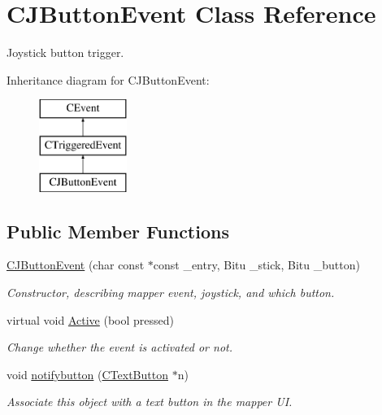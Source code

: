 \hypertarget{classCJButtonEvent}{\section{C\-J\-Button\-Event Class Reference}
\label{classCJButtonEvent}
}


Joystick button trigger.  


Inheritance diagram for C\-J\-Button\-Event\-:\begin{figure}[H]
\begin{center}
\leavevmode
\includegraphics[height=3.000000cm]{classCJButtonEvent}
\end{center}
\end{figure}
\subsection*{Public Member Functions}
\begin{DoxyCompactItemize}
\item 
\hypertarget{classCJButtonEvent_a1e52758b5a23171097f00bae1acf028a}{\hyperlink{classCJButtonEvent_a1e52758b5a23171097f00bae1acf028a}{C\-J\-Button\-Event} (char const $\ast$const \-\_\-entry, Bitu \-\_\-stick, Bitu \-\_\-button)}\label{classCJButtonEvent_a1e52758b5a23171097f00bae1acf028a}

\begin{DoxyCompactList}\small\item\em Constructor, describing mapper event, joystick, and which button. \end{DoxyCompactList}\item 
\hypertarget{classCJButtonEvent_ad3be3de6af81cfbcf569e2d9bcee7e84}{virtual void \hyperlink{classCJButtonEvent_ad3be3de6af81cfbcf569e2d9bcee7e84}{Active} (bool pressed)}\label{classCJButtonEvent_ad3be3de6af81cfbcf569e2d9bcee7e84}

\begin{DoxyCompactList}\small\item\em Change whether the event is activated or not. \end{DoxyCompactList}\item 
\hypertarget{classCJButtonEvent_adc04a0aadec5744e0408c5e780d54d6b}{void \hyperlink{classCJButtonEvent_adc04a0aadec5744e0408c5e780d54d6b}{notifybutton} (\hyperlink{classCTextButton}{C\-Text\-Button} $\ast$n)}\label{classCJButtonEvent_adc04a0aadec5744e0408c5e780d54d6b}

\begin{DoxyCompactList}\small\item\em Associate this object with a text button in the mapper U\-I. \end{DoxyCompactList}\end{DoxyCompactItemize}
